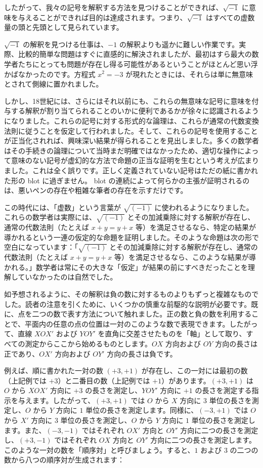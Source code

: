 \documentclass[a4paper,11pt,openany]{ltjsbook}
\begin{document}
したがって、我々の記号を解釈する方法を見つけることができれば、\(\sqrt{-1}\) に意味を与えることができれば目的は達成されます。つまり、\(\sqrt{-1}\) はすべての虚数量の頭と先頭として見られています。

\(\sqrt{-1}\) の解釈を見つける仕事は、\(-1\) の解釈よりも遥かに難しい作業です。実際、比較的簡単な問題はすぐに直感的に解決されましたが、最初はすら最大の数学者たちにとっても問題が存在し得る可能性があるということがほとんど思い浮かばなかったのです。方程式 \(x^2 = -3\) が現れたときには、それらは単に無意味とされて側線に置かれました。

しかし、18世紀には、さらにはそれ以前にも、これらの無意味な記号に意味を付与する解釈が割り当てられることのいかに便利であるかが徐々に認識されるようになりました。これらの記号に対する形式的な論理は、これらが通常の代数変換法則に従うことを仮定して行われました。そして、これらの記号を使用することが正当化されれば、興味深い結果が得られることを見出しました。多くの数学者はその手続きの論理について当時まだ明確ではなかったため、適切な操作によって意味のない記号が虚幻的な方法で命題の正当な証明を生むという考えが広まりました。これは全く誤りです。正しく定義されていない記号はただの紙に書かれた形の blot に過ぎません。 blot の連続によって何らかの主張が証明されるのは、悪いペンの存在や粗雑な筆者の存在を示すだけです。

この時代には、「虚数」という言葉が $\sqrt{(-1)}$ に使われるようになりました。これらの数学者は実際には、$\sqrt{(-1)}$ とその加減乗除に対する解釈が存在し、通常の代数法則（たとえば $x + y = y + x$ 等）を満足させるなら、特定の結果が導かれるという一連の仮定的な命題を証明しました。そのような命題は次の形で空白になっています：「$\sqrt{(-1)}$ とその加減乗除に対する解釈が存在し、通常の代数法則（たとえば $x + y = y + x$ 等）を満足させるなら、このような結果が導かれる。」数学者は常にその大きな「仮定」が結果の前にすべきだったことを理解していなかったのは自然でした。

如予想されるように、その解釈は負の数に対するものよりもずっと複雑なものでした。読者の注意を引くために、いくつかの慎重な前駆的な説明が必要です。既に、点を二つの数で表す方法について触れました。正の数と負の数を利用することで、平面内の任意の点の位置は一対のこのような数で表現できます。したがって、直線 $XOX'$ および $YOY'$ を直角に交差させたものを「軸」として取り、すべての測定からここから始めるものとします。$OX$ 方向および $OY$ 方向の長さは正であり、$OX'$ 方向および $OY'$ 方向の長さは負です。

例えば、順に書かれた一対の数 $(+3, +1)$ が存在し、この一対には最初の数（上記例では $+3$）と二番目の数（上記例では $+1$）があります。$(+3, +1)$ は $O$ から $XOX'$ 方向に $+3$ の長さを測定し、$YOY'$ 方向に $+1$ の長さを測定する指示を与えます。したがって、$(+3, +1)$ では $O$ から $X$ 方向に $3$ 単位の長さを測定し、$O$ から $Y$ 方向に $1$ 単位の長さを測定します。同様に、$(-3, +1)$ では $O$ から $X'$ 方向に $3$ 単位の長さを測定し、$O$ から $Y$ 方向に $1$ 単位の長さを測定します。また、$(-3, -1)$ ではそれぞれ $OX'$ 方向と $OY'$ 方向に二つの長さを測定し、$(+3, -1)$ ではそれぞれ $OX$ 方向と $OY'$ 方向に二つの長さを測定します。このような一対の数を「順序対」と呼びましょう。すると、$1$ および $3$ の二つの数から八つの順序対が生成されます：
\end{document}
